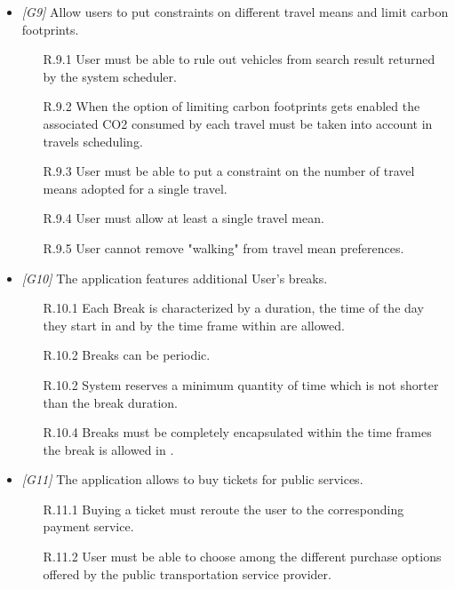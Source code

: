 \begin{itemize}
	\item \textit{[G9]} Allow users to put constraints on different travel means and limit carbon footprints.
		\begin{itemize}
			\item[R.9.1] User must be able to rule out vehicles from search result returned by the system scheduler.
			\item[R.9.2] When the option of limiting carbon footprints gets enabled the associated CO2 consumed by each travel must be taken into account in travels scheduling.
			\item[R.9.3] User must be able to put a constraint on the number of travel means adopted for a single travel.
			\item[R.9.4] User must allow at least a single travel mean.
			\item[R.9.5] User cannot remove "walking" from travel mean preferences.
		\end{itemize}


	\item \textit{[G10]} The application features additional User’s breaks.
		\begin{itemize}
			\item [R.10.1] Each Break is characterized by a duration, the time of the day they start in and by the time frame within are allowed.
			\item[R.10.2] Breaks can be periodic.
			\item[R.10.2] System reserves a minimum quantity of time which is not shorter than the break duration.
			\item[R.10.4] Breaks must be completely encapsulated within the time frames the break is allowed in	.
		\end{itemize}


	\item \textit{[G11]} The application allows to buy tickets for public services.
		\begin{itemize}
			\item[R.11.1] Buying a ticket must reroute the user to the corresponding payment service.
			\item[R.11.2] User must be able to choose among the different purchase options offered by the public transportation service provider.
		\end{itemize}



\end{itemize}
